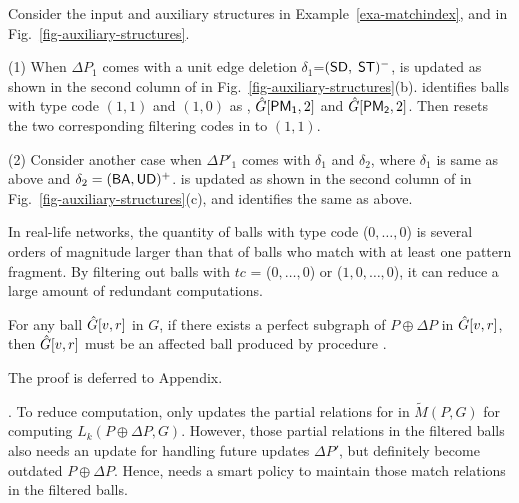 \begin{example}
\label{exa-identifyaffball}
Consider the input and auxiliary structures in Example~\ref{exa-matchindex}, and \bfc in Fig.~\ref{fig-auxiliary-structures}.

\sstab(1) When $\Delta P_1$ comes with a unit edge deletion $\delta_1$=$({\mathsf{SD}},$ ${\mathsf{ST}})^-$,
\bfc is updated as shown in the second column of \bfc in Fig.~\ref{fig-auxiliary-structures}(b).
\identifyaffball identifies balls with type code $(1, 1)$ and $(1, 0)$ as \affballsx,
\ie $\hat{G}{[{\mathsf{PM_1}},2]}$ and $\hat{G}{[{\mathsf{PM_2}},2]}$.
Then \identifyaffball resets the two corresponding filtering codes in \bfc to $(1, 1)$.


\sstab(2) Consider another case when $\Delta P'_1$ comes with $\delta_1$ and $\delta_2$, where $\delta_1$ is same as above and $\delta_2 = ({\mathsf{BA}},{\mathsf{UD}})^+$. \bfc is updated as shown in the second column of \bfc in Fig.~\ref{fig-auxiliary-structures}(c), and \identifyaffball identifies the same \affballsx as above.
\end{example}

In real-life networks, the quantity of balls with type code ($0,\ldots,0$) is several orders of magnitude larger than that of balls who match with at least one pattern fragment. By filtering out balls with \eg $tc$ = ($0,\ldots,0$) or ($1,0,\ldots,0$),
it can reduce a large amount of redundant computations.


\begin{prop}
\label{prop-canaffballs}
For any ball $\hat{G}{[v,r]}$ in $G$, if there exists a perfect subgraph of $P\oplus \Delta P$ in $\hat{G}{[v,r]}$,
then $\hat{G}{[v,r]}$ must be an affected ball produced by procedure \identifyaffball.
\end{prop}

The proof is deferred to Appendix.


. To reduce computation, \incp only updates the partial relations for \affballsx in $\tilde{M}(P,G)$ for computing  $L_k(P\oplus \Delta P, G)$.
However, those partial relations in the filtered balls also needs an update for handling future updates $\Delta P'$, but
definitely become outdated \wrt $P\oplus \Delta P$. 
Hence, \incp needs a smart policy to maintain those match relations in the filtered balls. 


